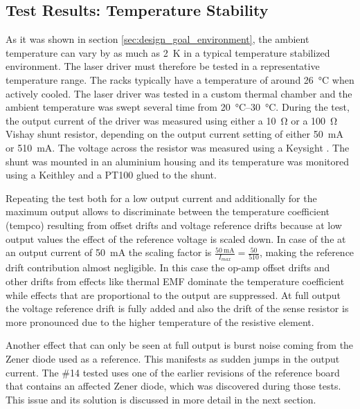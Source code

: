 \subsection{Test Results: Temperature Stability}%
\label{sec:results_temperature_stability}
As it was shown in section \ref{sec:design_goal_environment}, the ambient temperature can vary by as much as \qty{2}{\kelvin} in a typical temperature stabilized environment. The laser driver must therefore be tested in a representative temperature range. The racks typically have a temperature of around \qty{26}{\celsius} when actively cooled. The laser driver was tested in a custom thermal chamber and the ambient temperature was swept several time from \qtyrange[range-units = single, range-phrase={~to~}]{20}{30}{\celsius}. During the test, the output current of the driver was measured using either a \qty{10}{\ohm} or a \qty{100}{\ohm} Vishay  shunt resistor, depending on the output current setting of either \qty{50}{\mA} or \qty{510}{\mA}. The voltage across the resistor was measured using a Keysight . The shunt was mounted in an aluminium housing and its temperature was monitored using a Keithley  and a PT100 glued to the shunt.

Repeating the test both for a low output current and additionally for the maximum output allows to discriminate between the temperature coefficient (tempco) resulting from offset drifts and voltage reference drifts because at low output values the effect of the reference voltage is scaled down. In case of the  at an output current of \qty{50}{\mA} the scaling factor is $\frac{\qty{50}{\mA}}{I_{max}}=\frac{50}{510}$, making the reference drift contribution almost negligible. In this case the op-amp offset drifts and other drifts from effects like thermal EMF dominate the temperature coefficient while effects that are proportional to the output are suppressed. At full output the voltage reference drift is fully added and also the drift of the sense resistor is more pronounced due to the higher temperature of the resistive element.

Another effect that can only be seen at full output is burst noise coming from the Zener diode used as a reference. This manifests as sudden jumps in the output current. The  \#14 tested uses one of the earlier revisions of the reference board that contains an affected Zener diode, which was discovered during those tests. This issue and its solution is discussed in more detail in the next section.

